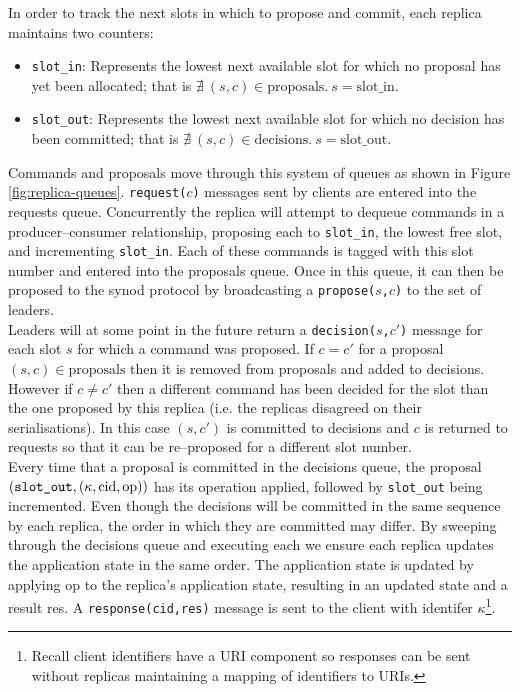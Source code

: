 In order to track the next slots in which to propose and commit, each replica maintains two counters:
\begin{itemize}
  \item \texttt{slot\_in}: Represents the lowest next available slot for which no proposal has yet been allocated; that is $\nexists  \ \left( s, c \right) \in \textrm{proposals}. \ s = \textrm{slot\_in}$.
  \item \texttt{slot\_out}: Represents the lowest next available slot for which no decision has been committed; that is $\nexists \ \left( s, c \right) \in \textrm{decisions}. \ s = \textrm{slot\_out}$.
\end{itemize}

Commands and proposals move through this system of queues as shown in Figure \ref{fig:replica-queues}. \texttt{request($c$)} messages sent by clients are entered into the requests queue. Concurrently the replica will attempt to dequeue commands in a producer--consumer relationship, proposing each to \texttt{slot\_in}, the lowest free slot, and incrementing \texttt{slot\_in}. Each of these commands is tagged with this slot number and entered into the proposals queue. Once in this queue, it can then be proposed to the synod protocol by broadcasting a \texttt{propose($s$,$c$)} to the set of leaders. \\

Leaders will at some point in the future return a \texttt{decision($s$,$c'$)} message for each slot $s$ for which a command was proposed. If $c = c'$ for a proposal $\left(s,c\right) \in \textrm{proposals}$ then it is removed from proposals and added to decisions. However if $c \neq c'$ then a different command has been decided for the slot than the one proposed by this replica (i.e. the replicas disagreed on their serialisations). In this case $\left(s,c'\right)$ is committed to decisions and $c$ is returned to requests so that it can be re--proposed for a different slot number. \\

Every time that a proposal is committed in the decisions queue, the proposal $\left( \textrm{\texttt{slot\_out}}, \left( \kappa, \textrm{cid}, \textrm{op} \right) \right)$ has its operation applied, followed by \texttt{slot\_out} being incremented. Even though the decisions will be committed in the same sequence by each replica, the order in which they are committed may differ. By sweeping through the decisions queue and executing each we ensure each replica updates the application state in the same order. The application state is updated by applying op to the replica's application state, resulting in an updated state and a result res. A \texttt{response(cid,res)} message is sent to the client with identifer $\kappa$\footnote{Recall client identifiers have a URI component so responses can be sent without replicas maintaining a mapping of identifiers to URIs.}. \\

